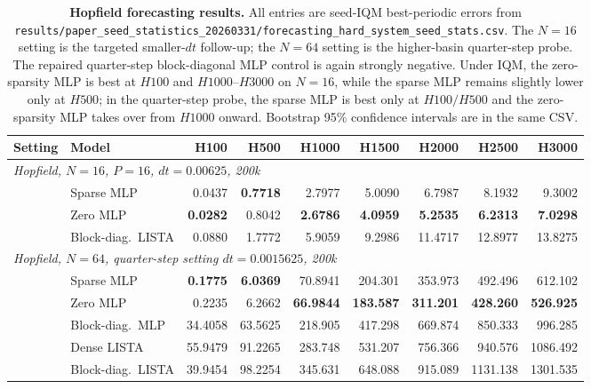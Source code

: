 \begin{table}[ht]
\centering
\scriptsize
\setlength{\tabcolsep}{3.5pt}
\begin{tabular}{p{}p{}rrrrrrr}
\toprule
Setting & Model & H100 & H500 & H1000 & H1500 & H2000 & H2500 & H3000 \\
\midrule
\multicolumn{9}{l}{\textit{Hopfield, $N=16$, $P=16$, $dt=0.00625$, 200k}} \\
& Sparse MLP & 0.0437 & \textbf{0.7718} & 2.7977 & 5.0090 & 6.7987 & 8.1932 & 9.3002 \\
& Zero MLP & \textbf{0.0282} & 0.8042 & \textbf{2.6786} & \textbf{4.0959} & \textbf{5.2535} & \textbf{6.2313} & \textbf{7.0298} \\
& Block-diag.\ LISTA & 0.0880 & 1.7772 & 5.9059 & 9.2986 & 11.4717 & 12.8977 & 13.8275 \\
\midrule
\multicolumn{9}{l}{\textit{Hopfield, $N=64$, quarter-step setting $dt=0.0015625$, 200k}} \\
& Sparse MLP & \textbf{0.1775} & \textbf{6.0369} & 70.8941 & 204.301 & 353.973 & 492.496 & 612.102 \\
& Zero MLP & 0.2235 & 6.2662 & \textbf{66.9844} & \textbf{183.587} & \textbf{311.201} & \textbf{428.260} & \textbf{526.925} \\
& Block-diag.\ MLP & 34.4058 & 63.5625 & 218.905 & 417.298 & 669.874 & 850.333 & 996.285 \\
& Dense LISTA & 55.9479 & 91.2265 & 283.748 & 531.207 & 756.366 & 940.576 & 1086.492 \\
& Block-diag.\ LISTA & 39.9454 & 98.2254 & 345.631 & 648.088 & 915.089 & 1131.138 & 1301.535 \\
\bottomrule
\end{tabular}
\caption{\textbf{Hopfield forecasting results.} All entries are seed-IQM best-periodic errors from \texttt{results/paper\_seed\_statistics\_20260331/forecasting\_hard\_system\_seed\_stats.csv}. The $N=16$ setting is the targeted smaller-$dt$ follow-up; the $N=64$ setting is the higher-basin quarter-step probe. The repaired quarter-step block-diagonal MLP control is again strongly negative. Under IQM, the zero-sparsity MLP is best at $H100$ and $H1000$--$H3000$ on $N=16$, while the sparse MLP remains slightly lower only at $H500$; in the quarter-step probe, the sparse MLP is best only at $H100/H500$ and the zero-sparsity MLP takes over from $H1000$ onward. Bootstrap 95\% confidence intervals are in the same CSV.}
\label{tab:review-hard-hopfield-20260314}
\end{table}


